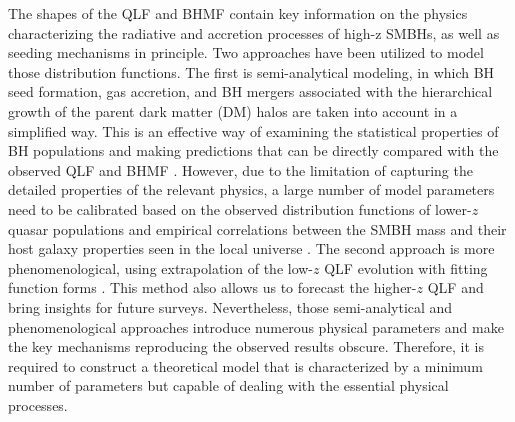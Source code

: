 \documentclass[twocolumn, twocolappendix]{aastex63}
\begin{document}
\begin{CJK*}{UTF8}{gbsn}
The shapes of the QLF and BHMF contain key information on the physics characterizing the radiative 
and accretion processes of high-z SMBHs, as well as seeding mechanisms in principle.
Two approaches have been utilized to model those distribution functions.  
The first is semi-analytical modeling, in which BH seed formation, gas accretion, and BH mergers associated 
with the hierarchical growth of the parent dark matter (DM) halos are taken into account in a simplified way. 
This is an effective way of examining the statistical properties of BH populations and making predictions 
that can be directly compared with the observed QLF and BHMF
\citep[e.g.,][]{1998ApJ...503..505H,2010ApJ...718..231S,2018MNRAS.474.1995R,2018MNRAS.481.3278R,
2021MNRAS.508.2706Y,2021ApJ...910L..11K,2022MNRAS.511..616T}. 
However, due to the limitation of capturing the detailed properties of the relevant physics, 
a large number of model parameters need to be calibrated based on the observed distribution functions 
of lower-$z$ quasar populations \citep[e.g.,][]{2007ApJ...669...45H}
and empirical correlations between the SMBH mass and their host galaxy properties seen
in the local universe \citep{2013ARA&A..51..511K}.
The second approach is more phenomenological, using extrapolation of the low-$z$ QLF evolution with 
fitting function forms \citep[e.g.,][]{2019MNRAS.488.1035K,2020MNRAS.495.3252S,2022arXiv220702233F}.
This method also allows us to forecast the higher-$z$ QLF and bring insights for future surveys.
Nevertheless, those semi-analytical and phenomenological approaches introduce numerous physical parameters
and make the key mechanisms reproducing the observed results obscure.
Therefore, it is required to construct a theoretical model that is characterized by a minimum number of parameters
but capable of dealing with the essential physical processes.



\end{CJK*}
\end{document}
